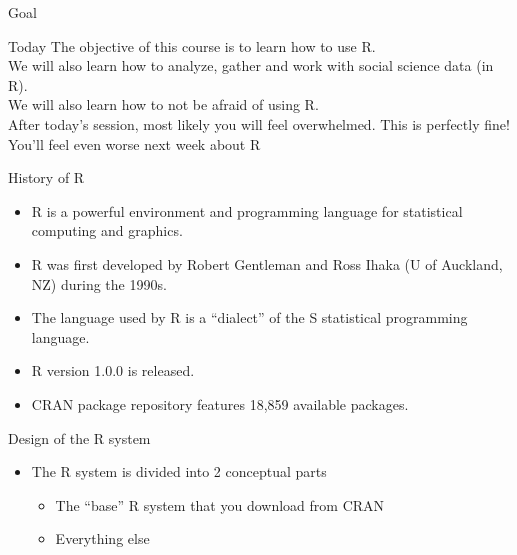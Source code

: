 \documentclass{beamer}
\begin{document}
\begin{frame}{Goal}
\begin{block}{Today} 
The objective of this course is to learn how to use R. \\
We will also learn how to \alert{analyze}, \alert{gather} and \alert{work} with social science data (in R).\\
We will also learn how to not be afraid of using R. \\
After today's session, most likely you will feel overwhelmed. This is perfectly fine! \\
You'll feel even worse next week about R 
\end{block}
\end{frame}

\begin{frame}{History of R}
\begin{itemize}[<+->]
\item R is a powerful environment and programming language for statistical computing and graphics.
\item R was first developed by Robert Gentleman and Ross Ihaka (U of Auckland, NZ) during the 1990s.
\item The language used by R is a ``dialect'' of the S statistical programming language.
\item R version 1.0.0 is released.
\item CRAN package repository features 18,859 available packages.
 \end{itemize} 
\end{frame}


\begin{frame}{Design of the R system}
\begin{itemize}[<+->]
\item The R system is divided into 2 conceptual parts
\begin{itemize}
  \item The ``base'' R system that you download from CRAN
  \item Everything else
  \end{itemize}
 \end{itemize} 
\end{frame}
\end{document}
